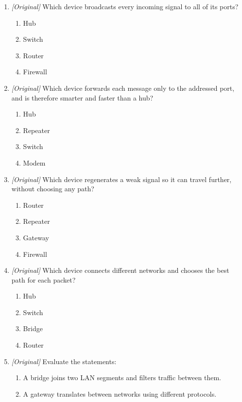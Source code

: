 \documentclass[11pt]{article}
\begin{document}
\begin{enumerate}[label=\textbf{Q\arabic*.}, leftmargin=*]
\begin{enumerate}[label=\Alph*.]
    \item Telephone cord with an infrared LED
  \end{enumerate}
\item \textit{[Original]} Which device broadcasts every incoming signal to
  all of its ports?
  \begin{enumerate}[label=\Alph*.]
    \item Hub
    \item Switch
    \item Router
    \item Firewall
  \end{enumerate}
\item \textit{[Original]} Which device forwards each message only to the
  addressed port, and is therefore smarter and faster than a hub?
  \begin{enumerate}[label=\Alph*.]
    \item Hub
    \item Repeater
    \item Switch
    \item Modem
  \end{enumerate}
\item \textit{[Original]} Which device regenerates a weak signal so it can
  travel further, without choosing any path?
  \begin{enumerate}[label=\Alph*.]
    \item Router
    \item Repeater
    \item Gateway
    \item Firewall
  \end{enumerate}
\item \textit{[Original]} Which device connects different networks and
  chooses the best path for each packet?
  \begin{enumerate}[label=\Alph*.]
    \item Hub
    \item Switch
    \item Bridge
    \item Router
  \end{enumerate}
\item \textit{[Original]} Evaluate the statements:
  \begin{enumerate}[label=\Roman*.]
    \item A bridge joins two LAN segments and filters traffic between them.
    \item A gateway translates between networks using different protocols.

\end{enumerate}
\end{enumerate}
\end{document}

